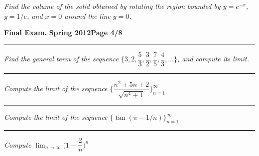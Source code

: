 \documentclass[12pt]{article}
\begin{document}
{\problem [5 pts] \em Find the volume of the solid obtained by rotating the region bounded by $y=e^{-x}$, $y=1/e$, and $x=0$ around the line $y=0$.}
\vspace{4.5cm}
\begin{flushright}
\end{flushright}

\newpage

\hfill{\large\bf Final Exam.}\hfill{\large\bf
  Spring 2012}\hfill{\large\bf Page 4/8}\hrule

\bigskip
{\problem[5 pts] \em Find the general term of the sequence $\bigg\{
  3,2,\dfrac{5}{3}, \dfrac{3}{2}, \dfrac{7}{5}, \dfrac{4}{3}, \dotsc
  \bigg\}$, and compute its limit.}
\vspace{2cm}
\begin{flushright}
\end{flushright}
\hrule

{ \em Compute the limit of the sequence $\bigg\{
\dfrac{n^2+5n+2}{\sqrt{n^4+1}} \bigg\}_{n=1}^\infty$}
\vspace{2cm}
\begin{flushright}
\end{flushright}
\hrule

{ \em Compute the limit of the sequence $\big\{ \tan (\pi - 1/n)
\big\}_{n=1}^\infty$}
\vspace{2cm}
\begin{flushright}
\end{flushright}
\hrule

{ \em Compute $\displaystyle{\lim_{n\to \infty}} \bigg(
  1 - \dfrac{2}{n} \bigg)^n$}
\vspace{2cm}
\begin{flushright}
\end{flushright}
\newpage
\end{document}
